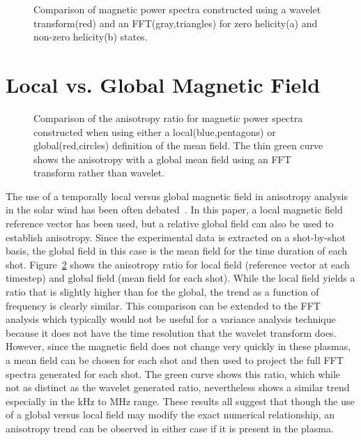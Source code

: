 \documentclass[preprint2]{aastex}
\begin{document}
\begin{figure}
\caption{\label{fig:WavevsFFT} Comparison of magnetic power spectra constructed using a wavelet transform(red) and an FFT(gray,triangles) for zero helicity(a) and non-zero helicity(b) states.}
\end{figure}

\section{Local vs. Global Magnetic Field}\label{sec:LocGlobe}

\begin{figure}
\caption{\label{fig:globalcomparison} Comparison of the anisotropy ratio for magnetic power spectra constructed when using either a local(blue,pentagons) or global(red,circles) definition of the mean field. The thin green curve shows the anisotropy with a global mean field using an FFT transform rather than wavelet.}
\end{figure}

The use of a temporally local versus global magnetic field in anisotropy analysis in the solar wind has been often debated~\citep{pod09,mat12}. In this paper, a local magnetic field reference vector has been used, but a relative global field can also be used to establish anisotropy. Since the experimental data is extracted on a shot-by-shot basis, the global field in this case is the mean field for the time duration of each shot. Figure~\ref{fig:globalcomparison} shows the anisotropy ratio for local field (reference vector at each timestep) and global field (mean field for each shot). While the local field yields a ratio that is slightly higher than for the global, the trend as a function of frequency is clearly similar. This comparison can be extended to the FFT analysis which typically would not be useful for a variance analysis technique because it does not have the time resolution that the wavelet transform does. However, since the magnetic field does not change very quickly in these plasmas, a mean field can be chosen for each shot and then used to project the full FFT spectra generated for each shot. The green curve shows this ratio, which while not as distinct as the wavelet generated ratio, nevertheless shows a similar trend especially in the kHz to MHz range. These results all suggest that though the use of a global versus local field may modify the exact numerical relationship, an anisotropy trend can be observed in either case if it is present in the plasma.
\end{document}
